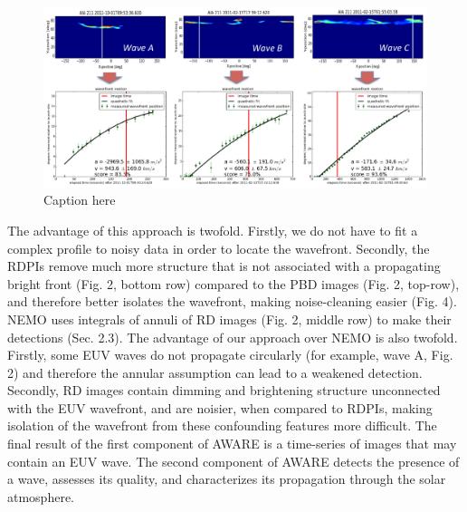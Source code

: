 \begin{figure}
\begin{center}
\includegraphics[width=16cm]{aware_velocity_figure_v3.pdf}
\caption{Caption here}
\end{center}
\end{figure}

The advantage of this approach is twofold. Firstly, we do not have to fit a complex profile to noisy data in order to locate the wavefront. Secondly, the RDPIs remove much more structure that is not associated with a propagating bright front (Fig. 2, bottom row) compared to the PBD images (Fig. 2, top-row), and therefore better isolates the wavefront, making noise-cleaning easier (Fig. 4).  NEMO \citep{2005SoPh..228..265P} uses integrals of annuli of RD images (Fig. 2, middle row) to make their detections (Sec. 2.3).  The advantage of our approach over NEMO is also twofold.  Firstly, some EUV waves do not propagate circularly (for example, wave A, Fig. 2) and therefore the annular assumption can lead to a weakened detection.  Secondly, RD images contain dimming and brightening structure unconnected with the EUV wavefront, and are noisier,  when compared to RDPIs, making isolation of the wavefront from these confounding features more difficult. The final result of the first component of AWARE is a time-series of images that may contain an EUV wave.  The second component of AWARE detects the presence of a wave, assesses its quality, and characterizes its propagation through the solar atmosphere.

